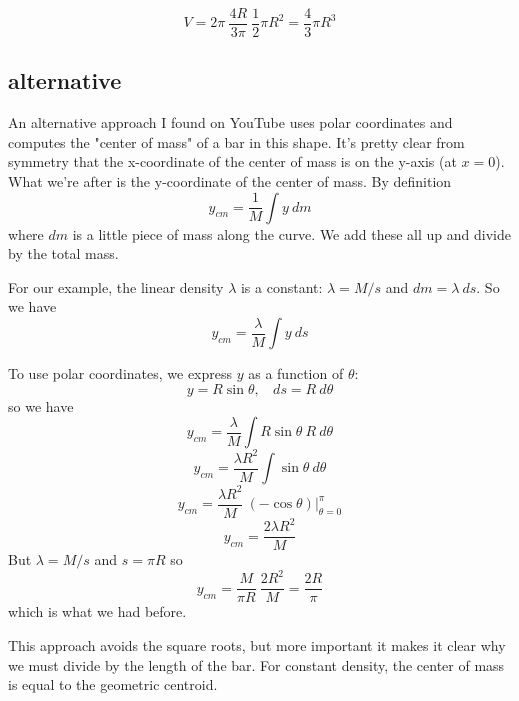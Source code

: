 \documentclass[11pt, oneside]{article}   	%
\begin{document}
\[ V = 2 \pi \ \frac{4 R}{3 \pi} \ \frac{1}{2} \pi R^2 = \frac{4}{3} \pi R^3 \]

\subsection*{alternative}

An alternative approach I found on YouTube uses polar coordinates and computes the "center of mass" of a bar in this shape.  It's pretty clear from symmetry that the x-coordinate of the center of mass is on the y-axis (at $x=0$).  What we're after is the y-coordinate of the center of mass.  By definition
\[ y_{cm} = \frac{1}{M} \int y \ dm \]
where $dm$ is a little piece of mass along the curve.  We add these all up and divide by the total mass.

For our example, the linear density $\lambda$ is a constant:  $\lambda = M/s$ and $ dm = \lambda \ ds$.  So we have
\[ y_{cm} = \frac{\lambda}{M} \int y \ ds \]

To use polar coordinates, we express $y$ as a function of $\theta$:
\[ y = R \sin \theta, \ \ \ \ ds = R \ d \theta \]
so we have
\[ y_{cm} = \frac{\lambda}{M} \int R \sin \theta  \ R \ d\theta \]
\[ y_{cm} = \frac{\lambda R^2}{M} \int \sin \theta \ d\theta \]
\[ y_{cm} = \frac{\lambda R^2}{M} \ (-\cos \theta ) \bigg |_{\theta=0}^{\pi}  \]
\[ y_{cm} = \frac{2 \lambda R^2}{M}  \]
But $\lambda=M/s$ and $s=\pi R$ so 
\[ y_{cm} = \frac{M}{\pi R} \ \frac{2 R^2}{M} = \frac{2R}{\pi}  \]
which is what we had before.

This approach avoids the square roots, but more important it makes it clear why we must divide by the length of the bar.  For constant density, the center of mass is equal to the geometric centroid.
\end{document}
